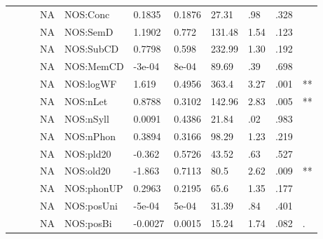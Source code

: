 \begin{table}[ht]
\begin{tabular}{lllllllllll}
   &  &  & NA & NOS:Conc & 0.1835 & 0.1876 & 27.31 & .98 & .328 &   \\ 
   &  &  & NA & NOS:SemD & 1.1902 & 0.772 & 131.48 & 1.54 & .123 &   \\ 
   &  &  & NA & NOS:SubCD & 0.7798 & 0.598 & 232.99 & 1.30 & .192 &   \\ 
   &  &  & NA & NOS:MemCD & -3e-04 & 8e-04 & 89.69 & .39 & .698 &   \\ 
   &  &  & NA & NOS:logWF & 1.619 & 0.4956 & 363.4 & 3.27 & .001 & ** \\ 
   &  &  & NA & NOS:nLet & 0.8788 & 0.3102 & 142.96 & 2.83 & .005 & ** \\ 
   &  &  & NA & NOS:nSyll & 0.0091 & 0.4386 & 21.84 & .02 & .983 &   \\ 
   &  &  & NA & NOS:nPhon & 0.3894 & 0.3166 & 98.29 & 1.23 & .219 &   \\ 
   &  &  & NA & NOS:pld20 & -0.362 & 0.5726 & 43.52 & .63 & .527 &   \\ 
   &  &  & NA & NOS:old20 & -1.863 & 0.7113 & 80.5 & 2.62 & .009 & ** \\ 
   &  &  & NA & NOS:phonUP & 0.2963 & 0.2195 & 65.6 & 1.35 & .177 &   \\ 
   &  &  & NA & NOS:posUni & -5e-04 & 5e-04 & 31.39 & .84 & .401 &   \\ 
   &  &  & NA & NOS:posBi & -0.0027 & 0.0015 & 15.24 & 1.74 & .082 & . \\ 
   \hline
\end{tabular}
\endgroup
\end{table}
